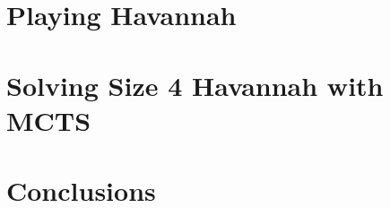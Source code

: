 \documentclass[12pt, letterpaper]{report}
\renewcommand{\baselinestretch}{1.33}
\numberwithin{equation}{section}
\begin{document}
	\chapter[Playing Havannah]{\label{playing} \LARGE Playing Havannah }
	
	
	\chapter[Solving Size 4 Havannah!]{\label{bchapterlabel} \LARGE Solving Size 4 Havannah with MCTS}
	

	\chapter[Conclusions]{\label{conc} \LARGE Conclusions}
	
	
%		
	
	
	\small
	\renewcommand{\baselinestretch}{0.25}
	
\end{document}

